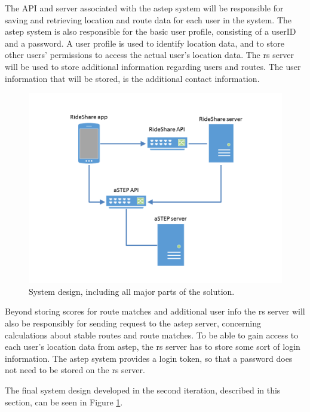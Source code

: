 The API and server associated with the \gls{astep} system will be responsible for saving and retrieving location and route data for each user in the system.
The \gls{astep} system is also responsible for the basic user profile, consisting of a userID and a password.
A user profile is used to identify location data, and to store other users' permissions to access the actual user's location data.
The \gls{rs} server will be used to store additional information regarding users and routes.
The user information that will be stored, is the additional contact information.

\begin{figure}[!h]
	\centering
	\includegraphics[width=\textwidth]{figures/SystemDesign.png}
	\caption{System design, including all major parts of the solution.}
	\label{fig:s2systemdesign}
\end{figure}




Beyond storing scores for route matches and additional user info the \gls{rs} server will also be responsibly for sending request to the \gls{astep} server, concerning calculations about stable routes and route matches.
To be able to gain access to each user's location data from \gls{astep}, the \gls{rs} server has to store some sort of login information.
The \gls{astep} system provides a login token, so that a password does not need to be stored on the \gls{rs} server.


The final system design developed in the second iteration, described in this section, can be seen in Figure \ref{fig:s2systemdesign}.

